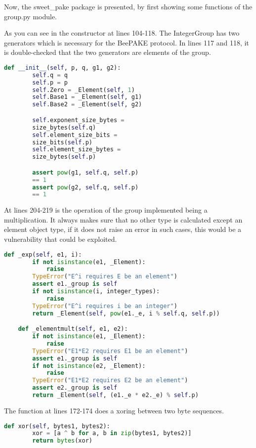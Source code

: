 \documentclass[../main.tex]{subfiles}
\begin{document}
Now, the sweet\_pake package is presented, by first showing some functions of
the group.py module.

As you can see in the constructor at lines 104-118. The IntegerGroup has two generators which 
is necessary for the BeePAKE protocol. In lines 117 and 118, it is double-checked that the
two generators are elements of the group.

\begin{lstlisting}[language=Python]
    def __init__(self, p, q, g1, g2):
        self.q = q  
        self.p = p 
        self.Zero = _Element(self, 1)
        self.Base1 = _Element(self, g1)
        self.Base2 = _Element(self, g2)

        self.exponent_size_bytes = 
		size_bytes(self.q)
        self.element_size_bits = 
		size_bits(self.p)
        self.element_size_bytes = 
		size_bytes(self.p)

        assert pow(g1, self.q, self.p)
		== 1
        assert pow(g2, self.q, self.p) 
		== 1
\end{lstlisting}

At lines 204-219 is the operation of the group implemented being a
multiplication. It always makes sure that no other type is calculated except an
element object type, if it does not raise an error in such cases, this would be
a vulnerability that could be exploited.

\begin{lstlisting}[language=Python]
    def _exp(self, e1, i):
        if not isinstance(e1, _Element):
            raise 
	    TypeError("E^i requires E be an element")
        assert e1._group is self
        if not isinstance(i, integer_types):
            raise 
	    TypeError("E^i requires i be an integer")
        return _Element(self, pow(e1._e, i % self.q, self.p))

    def _elementmult(self, e1, e2):
        if not isinstance(e1, _Element):
            raise 
	    TypeError("E1*E2 requires E1 be an element")
        assert e1._group is self
        if not isinstance(e2, _Element):
            raise 
	    TypeError("E1*E2 requires E2 be an element")
        assert e2._group is self
        return _Element(self, (e1._e * e2._e) % self.p)
\end{lstlisting}

The function at lines 172-174 does a xoring between two byte sequences.

\begin{lstlisting}[language=Python]
def xor(self, bytes1, bytes2):
        xor = [a ^ b for a, b in zip(bytes1, bytes2)]
        return bytes(xor)
\end{lstlisting}
\end{document}
